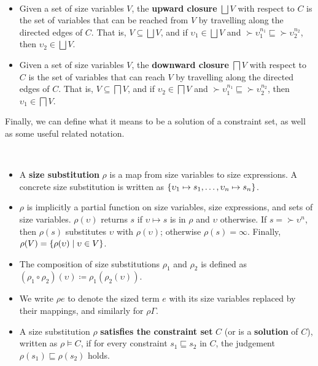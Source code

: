 \begin{definition}~\\[-4ex]
\begin{itemize}
  \item Given a set of size variables $V$, the \textbf{upward closure} $\bigsqcup V$ with respect to $C$ is the set of variables that can be reached from $V$ by travelling along the directed edges of $C$.
  That is, $V \subseteq \bigsqcup V$, and if $\upsilon_1 \in \bigsqcup V$ and $\succ{\upsilon}_1^{n_1} \sqsubseteq \succ{\upsilon}_2^{n_2}$, then $\upsilon_2 \in \bigsqcup V$.
  \item Given a set of size variables $V$, the \textbf{downward closure} $\bigsqcap V$ with respect to $C$ is the set of variables that can reach $V$ by travelling along the directed edges of $C$.
  That is, $V \subseteq \bigsqcap V$, and if $\upsilon_2 \in \bigsqcap V$ and $\succ{\upsilon}_1^{n_1} \sqsubseteq \succ{\upsilon}_2^{n_2}$, then $\upsilon_1 \in \bigsqcap V$.
\end{itemize}
\end{definition}

Finally, we can define what it means to be a solution of a constraint set,
as well as some useful related notation.

\begin{definition}~\\[-4ex]
\begin{itemize}
  \item A \textbf{size substitution} $\rho$ is a map from size variables to size expressions.
  A concrete size substitution is written as $\{\upsilon_1 \mapsto s_1, \dots, \upsilon_n \mapsto s_n\}$.

  \item $\rho$ is implicitly a partial function on size variables, size expressions, and sets of size variables. $\rho(\upsilon)$ returns $s$ if $\upsilon \mapsto s$ is in $\rho$ and $\upsilon$ otherwise. If $s = \succ{\upsilon}^n$, then $\rho(s)$ substitutes $\upsilon$ with $\rho(\upsilon)$; otherwise $\rho(s) = \infty$. Finally, $\rho(V) = \{\rho(\upsilon) \mid \upsilon \in V\}$.

  \item The composition of size substitutions $\rho_1$ and $\rho_2$ is defined as \mbox{$(\rho_1 \circ \rho_2)(\upsilon) \coloneqq \rho_1(\rho_2(\upsilon))$}.

  \item We write $\rho e$ to denote the sized term $e$ with its size variables replaced by their mappings, and similarly for $\rho \Gamma$.

  \item A size substitution $\rho$ \textbf{satisfies the constraint set} $C$ (or is a \textbf{solution} of $C$), written as $\rho \vDash C$, if for every constraint $s_1 \sqsubseteq s_2$ in $C$, the judgement $\rho(s_1) \sqsubseteq \rho(s_2)$ holds.
\end{itemize}
\end{definition}


